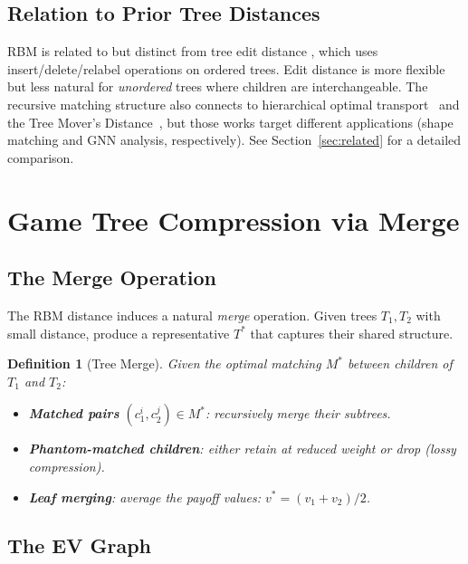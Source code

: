 \documentclass[11pt]{article}
\newtheorem{definition}[theorem]{Definition}
\begin{document}
\subsection{Relation to Prior Tree Distances}

RBM is related to but distinct from tree edit distance
\citep{zhang1996constrained}, which uses insert/delete/relabel
operations on ordered trees. Edit distance is more flexible but less
natural for \emph{unordered} trees where children are interchangeable.
The recursive matching structure also connects to hierarchical optimal
transport~\citep{memoli2011gromov} and the Tree Mover's
Distance~\citep{chuang2022tree}, but those works target different
applications (shape matching and GNN analysis, respectively). See
Section~\ref{sec:related} for a detailed comparison.

\section{Game Tree Compression via Merge}
\label{sec:merge}

\subsection{The Merge Operation}

The RBM distance induces a natural \emph{merge} operation. Given trees
$T_1, T_2$ with small distance, produce a representative $T^*$ that
captures their shared structure.

\begin{definition}[Tree Merge]
Given the optimal matching $M^*$ between children of $T_1$ and $T_2$:
\begin{itemize}[nosep]
  \item \textbf{Matched pairs} $(c_1^i, c_2^j) \in M^*$: recursively
    merge their subtrees.
  \item \textbf{Phantom-matched children}: either retain at reduced
    weight or drop (lossy compression).
  \item \textbf{Leaf merging}: average the payoff values: $v^* =
    (v_1 + v_2) / 2$.
\end{itemize}
\end{definition}

\subsection{The EV Graph}
\end{document}

